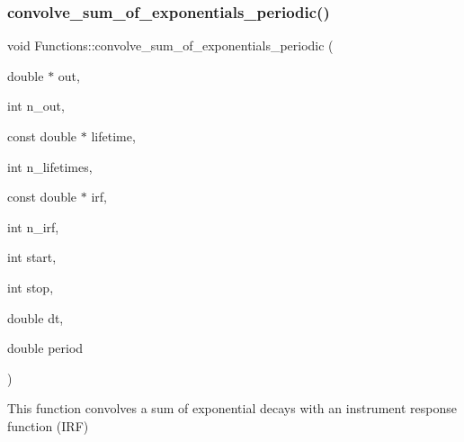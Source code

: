 \subsubsection{\texorpdfstring{convolve\+\_\+sum\+\_\+of\+\_\+exponentials\+\_\+periodic()}{convolve\_sum\_of\_exponentials\_periodic()}}
{\footnotesize\ttfamily void Functions\+::convolve\+\_\+sum\+\_\+of\+\_\+exponentials\+\_\+periodic (\begin{DoxyParamCaption}\item[{double $\ast$}]{out,  }\item[{int}]{n\+\_\+out,  }\item[{const double $\ast$}]{lifetime,  }\item[{int}]{n\+\_\+lifetimes,  }\item[{const double $\ast$}]{irf,  }\item[{int}]{n\+\_\+irf,  }\item[{int}]{start,  }\item[{int}]{stop,  }\item[{double}]{dt,  }\item[{double}]{period }\end{DoxyParamCaption})}

This function convolves a sum of exponential decays with an instrument response function (I\+RF)

